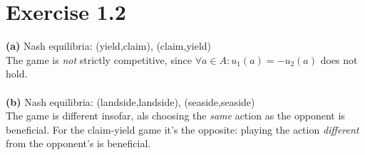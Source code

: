 \documentclass[11pt,a4paper]{article}
\begin{document}
\section*{Exercise 1.2}
\textbf{(a)} Nash equilibria: (yield,claim), (claim,yield)\\
The game is \emph{not} strictly competitive, since $\forall a\in A: u_1(a)=-u_2(a)$ does not hold.\\
\\
\textbf{(b)} Nash equilibria: (landside,landside), (seaside,seaside)\\
The game is different insofar, als choosing the \emph{same} action as the opponent is beneficial. For the claim-yield game it's the opposite: playing the action \emph{different} from the opponent's is beneficial.

\label{lastpage}
\end{document}
